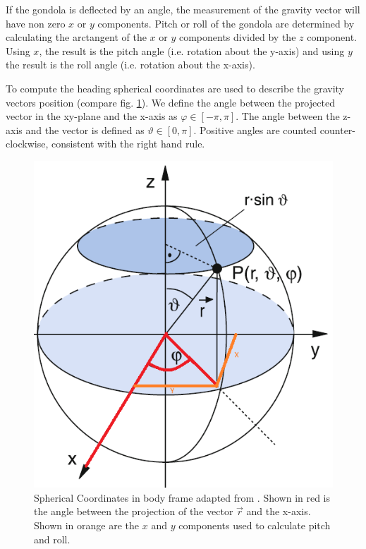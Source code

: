 If the gondola is deflected by an angle, the measurement of the gravity vector will have non zero $x$ or $y$ components. Pitch or roll of the gondola are determined by calculating the arctangent of the $x$ or $y$ components divided by the $z$ component. Using $x$, the result is the pitch angle (i.e. rotation about the y-axis) and using $y$ the result is the roll angle (i.e. rotation about the x-axis).

To compute the heading spherical coordinates are used to describe the gravity vectors position (compare fig. \ref{fig:meth:spherical_coordinates}). We define the angle between the projected vector in the xy-plane and the x-axis as $\varphi\in[-\pi,\pi]$. The angle between the z-axis and the vector is defined as $\vartheta\in[0,\pi]$. Positive angles are counted counter-clockwise, consistent with the right hand rule.

\begin{figure}[H]
    \centering
    \includegraphics[width=0.5\linewidth]{images/02_methodology/spherical_coords.png}
    \caption[Spherical Coordinates adapted from \parencite{Demtröder2020-mw}.]{Spherical Coordinates in body frame adapted from \parencite{Demtröder2020-mw}. Shown in red is the angle between the projection of the vector $\vec{r}$ and the x-axis. Shown in orange are the $x$ and $y$ components used to calculate pitch and roll.}
    \label{fig:meth:spherical_coordinates}
\end{figure}

